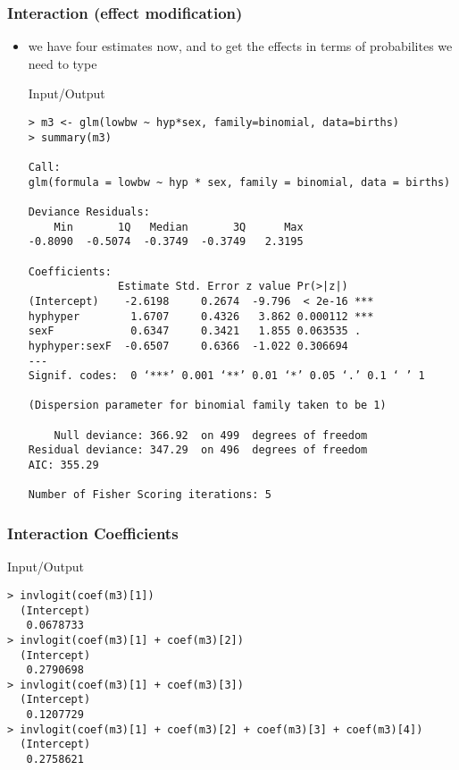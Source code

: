 \begin{frame}[fragile]\frametitle{Interaction (effect modification)}
\begin{itemize}
\item we have four estimates now, and to get the effects in terms of probabilites we need to type\scriptsize
  \begin{exampleblock}{Input/Output}
\begin{verbatim}
> m3 <- glm(lowbw ~ hyp*sex, family=binomial, data=births)
> summary(m3)

Call:
glm(formula = lowbw ~ hyp * sex, family = binomial, data = births)

Deviance Residuals: 
    Min       1Q   Median       3Q      Max  
-0.8090  -0.5074  -0.3749  -0.3749   2.3195  

Coefficients:
              Estimate Std. Error z value Pr(>|z|)    
(Intercept)    -2.6198     0.2674  -9.796  < 2e-16 ***
hyphyper        1.6707     0.4326   3.862 0.000112 ***
sexF            0.6347     0.3421   1.855 0.063535 .  
hyphyper:sexF  -0.6507     0.6366  -1.022 0.306694    
---
Signif. codes:  0 ‘***’ 0.001 ‘**’ 0.01 ‘*’ 0.05 ‘.’ 0.1 ‘ ’ 1

(Dispersion parameter for binomial family taken to be 1)

    Null deviance: 366.92  on 499  degrees of freedom
Residual deviance: 347.29  on 496  degrees of freedom
AIC: 355.29

Number of Fisher Scoring iterations: 5
\end{verbatim}
  \end{exampleblock}
\end{itemize}
\end{frame}


\begin{frame}[fragile]\frametitle{Interaction Coefficients}
  \begin{exampleblock}{Input/Output}\scriptsize
\begin{verbatim}
> invlogit(coef(m3)[1])
  (Intercept) 
   0.0678733 
> invlogit(coef(m3)[1] + coef(m3)[2])
  (Intercept) 
   0.2790698 
> invlogit(coef(m3)[1] + coef(m3)[3])
  (Intercept) 
   0.1207729 
> invlogit(coef(m3)[1] + coef(m3)[2] + coef(m3)[3] + coef(m3)[4])
  (Intercept) 
   0.2758621 
\end{verbatim}
  \end{exampleblock}
\end{frame}

